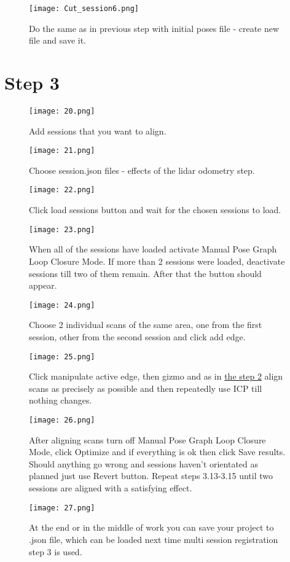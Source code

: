 \begin{figure}[H]
	\centering
	\texttt{[image: Cut\_session6.png]}
	\caption{Do the same as in previous step with initial poses file - create new file and save it.}
	\label{fig:25}
\end{figure}

\section{Step 3}
\begin{figure}[H]
	\centering
	\texttt{[image: 20.png]}
	\caption{Add sessions that you want to align.}
	\label{fig:26}
\end{figure}

\begin{figure}[H]
	\centering
	\texttt{[image: 21.png]}
	\caption{Choose session.json files - effects of the lidar odometry step.}
	\label{fig:27}
\end{figure}

\begin{figure}[H]
	\centering
	\texttt{[image: 22.png]}
	\caption{Click load sessions button and wait for the chosen sessions to load.}
	\label{fig:28}
\end{figure}

\begin{figure}[H]
	\centering
	\texttt{[image: 23.png]}
	\caption{When all of the sessions have loaded activate Manual Pose Graph Loop Closure Mode. If more than 2 sessions were loaded, deactivate sessions till two of them remain. After that the button should appear.}
	\label{fig:29}
\end{figure}

\begin{figure}[H]
	\centering
	\texttt{[image: 24.png]}
	\caption{Choose 2 individual scans of the same area, one from the first session, other from the second session and click add edge.}
	\label{fig:30}
\end{figure}

\begin{figure}[H]
	\centering
	\texttt{[image: 25.png]}
	\caption{Click manipulate active edge, then gizmo and as in \hyperref[fig:15]{the step 2} align scans as precisely as possible and then repeatedly use ICP till nothing changes.}
	\label{fig:31}
\end{figure}

\begin{figure}[H]
	\centering
	\texttt{[image: 26.png]}
	\caption{After aligning scans turn off Manual Pose Graph Loop Closure Mode, click Optimize and if everything is ok then click Save results. Should anything go wrong and sessions haven't orientated as planned just use Revert button. Repeat steps 3.13-3.15 until two sessions are aligned with a satisfying effect.}
	\label{fig:32}
\end{figure}

\begin{figure}[H]
	\centering
	\texttt{[image: 27.png]}
	\caption{At the end or in the middle of work you can save your project to .json file, which can be loaded next time multi session registration step 3 is used.}
	\label{fig:33}
\end{figure}